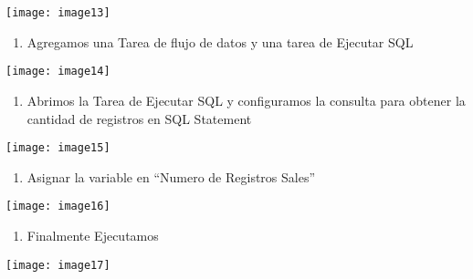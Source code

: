 \documentclass{article} %
\begin{document}
\noindent \texttt{[image: image13]}

\begin{enumerate}
\item  Agregamos una Tarea de flujo de datos y una tarea de Ejecutar SQL
\end{enumerate}

\noindent \texttt{[image: image14]}

\begin{enumerate}
\item  Abrimos la Tarea de Ejecutar SQL y configuramos la consulta para obtener la cantidad de registros en SQL Statement
\end{enumerate}

\noindent \texttt{[image: image15]}

\begin{enumerate}
\item  Asignar la variable en ``Numero de Registros Sales''
\end{enumerate}

\noindent \texttt{[image: image16]}

\noindent 

\noindent 

\noindent 

\noindent 

\begin{enumerate}
\item  Finalmente Ejecutamos
\end{enumerate}

\noindent \texttt{[image: image17]}

\noindent 

\noindent 
\end{document}
